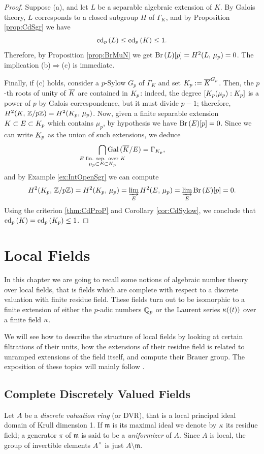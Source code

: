 \documentclass[a4paper, oneside]{memoir}
\begin{document}
\begin{proof}
	Suppose (a), and let $L$ be a separable algebraic extension of $K$. By Galois theory, $L$ corresponds to a closed subgroup $H$ of $\Gamma_K$, and by Proposition \ref{prop:CdSgr} we have
	\[
		\operatorname{cd}_p{(L)}\leq \operatorname{cd}_p{(K)}\leq 1.
	\]
	Therefore, by Proposition \ref{prop:BrMuN} we get \(\operatorname{Br}{(L)}[p]=H^{2}( L, \, \mu_p )=0\).
	The implication (b)$\Rightarrow$(c) is immediate.

	Finally, if (c) holds, consider a $p$-Sylow $G_p$ of $\Gamma_K$ and set $K_p:=\overline{K}^{G_p}$. Then, the $p$-th roots of unity of $\overline{K}$ are contained in $K_p$: indeed, the degree $[K_p(\mu_p):K_p]$ is a power of $p$ by Galois correspondence, but it must divide $p-1$; therefore, $H^{2}( K, \, \mathbb{Z}/{p\mathbb{Z}} )=H^{2}( K_p, \, \mu_p )$. Now, given a finite separable extension $K\subset E\subset K_p$  which contains $\mu_p$, by hypothesis we have $\operatorname{Br}{(E)}[p]=0$. Since we can write $K_p$ as the union of such extensions, we deduce
	\[
		\bigcap_{\mathclap{\substack{E\text{ fin. sep. over }\K \\ {\mu_p\subset E\subset \K_p}}}} \operatorname{Gal}{(\Ks/E)}=\Gamma_{\K_p},
	\]
	and by Example \ref{ex:IntOpenSgr} we can compute
	\[
		H^{2}( K_p, \, \mathbb{Z}/p\mathbb{Z} )=H^{2}( K_p, \, \mu_p )=\varinjlim_E{H^{2}( E, \, \mu_p )}=\varinjlim_E{\operatorname{Br}{(E)}[p]}=0.
	\]
	Using the criterion \ref{thm:CdProP} and Corollary \ref{cor:CdSylow}, we conclude that $\operatorname{cd}_p{(K)}=\operatorname{cd}_p{(K_p)}\leq 1$.
\end{proof}


\chapter{Local Fields}
In this chapter we are going to recall some notions of algebraic number theory over local fields, that is fields which are complete with respect to a discrete valuation with finite
residue field. These fields turn out to be isomorphic to a finite extension of either the $p$-adic numbers $\mathbb{Q}_p$ or the Laurent series $\kappa((t))$ over a finite field $\kappa$.

We will see how to describe the structure of local fields by looking at certain filtrations of their units, how the extensions of their residue field is related to unramped
extensions of the field itself, and compute their Brauer group. The exposition of these topics will mainly follow \cite{SerreCL}.

\section{Complete Discretely Valued Fields}
Let $A$ be a \textit{discrete valuation ring} (or DVR), that is a local principal ideal domain of Krull dimension 1. If $\mathfrak{m}$ is its maximal ideal we denote by $\kappa$ its
residue field; a generator $\pi$ of $\mathfrak{m}$ is said to be a \textit{uniformizer} of $A$. Since $A$ is local, the group of invertible elements $A^\times$ is just
$A\setminus\mathfrak{m}$.
\end{document}

